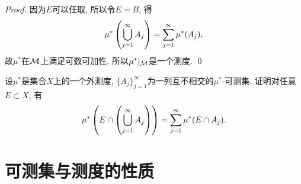 \begin{proof}
    因为$E$可以任取, 所以令$E=B$, 得
    $$\mu^*\left(\bigcup_{j=1}^{\infty}A_j\right) = \sum_{j=1}^{\infty}\mu^*(A_j), $$
    故$\mu^*$在$\mathcal{M}$上满足可数可加性, 所以$\mu^*|_{\mathcal{M}}$是一个测度. \qed 
\end{proof}
\begin{exercise}
    设$\mu^*$是集合$X$上的一个外测度, $\{A_j\}_{j=1}^\infty$为一列互不相交的$\mu^*$-可测集. 证明对任意$E \subset X$, 有
    $$\mu^*\left(E \cap \left(\bigcup_{j=1}^{\infty}A_j\right) \right) = \sum_{j=1}^{\infty}\mu^*(E \cap A_j). $$
\end{exercise}




\section{可测集与测度的性质}
